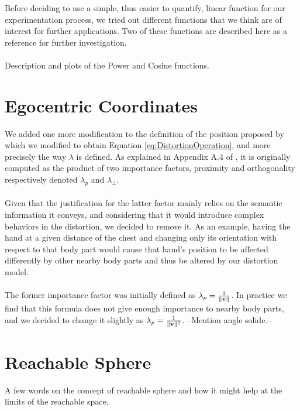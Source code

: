 Before deciding to use a simple, thus easier to quantify, linear function for our experimentation process, we tried out different functions that we think are of interest for further applications. Two of these functions are described here as a reference for further investigation.
\\\\
Description and plots of the Power and Cosine functions.

\section{Egocentric Coordinates}

We added one more modification to the definition of the position proposed by \cite{molla2017egocentric} which we modified to obtain Equation \ref{eq:DistortionOperation}, and more precisely the way $\lambda $ is defined. As explained in Appendix A.4 of \cite{molla2016precise}, it is originally computed as the product of two importance factors, proximity and orthogonality respectively denoted $\lambda_p$ and $\lambda_\bot $.
\\\\
Given that the justification for the latter factor mainly relies on the semantic information it conveys, and considering that it would introduce complex behaviors in the distortion, we decided to remove it. As an example, having the hand at a given distance of the chest and changing only its orientation with respect to that body part would cause that hand's position to be affected differently by other nearby body parts and thus be altered by our distortion model.
\\\\
The former importance factor was initially defined as $\lambda_p = \frac{1}{\lVert\mathbf{v}\rVert}$. In practice we find that this formula does not give enough importance to nearby body parts, and we decided to change it slightly as $\lambda_p = \frac{1}{\lVert\mathbf{v}\rVert^2}$. --Mention angle solide.-- %

\section{Reachable Sphere}

A few words on the concept of reachable sphere and how it might help at the limits of the reachable space.
